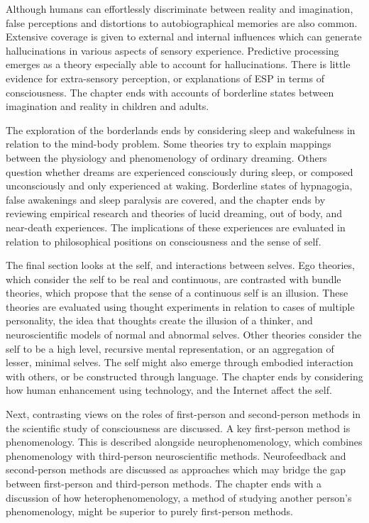 \documentclass[a4paper]{article}
\begin{document}
Although humans can effortlessly discriminate between reality and imagination,
false perceptions and distortions to autobiographical memories are also
common. Extensive coverage is given to external and internal influences which
can generate hallucinations in various aspects of sensory experience.
Predictive processing emerges as a theory especially able to account for
hallucinations. There is little evidence for extra-sensory perception, or
explanations of ESP in terms of consciousness. The chapter ends with accounts
of borderline states between imagination and reality in children and adults.

The exploration of the borderlands ends by considering sleep and wakefulness
in relation to the mind-body problem. Some theories try to explain mappings
between the physiology and phenomenology of ordinary dreaming. Others question
whether dreams are experienced consciously during sleep, or composed
unconsciously and only experienced at waking. Borderline states of hypnagogia,
false awakenings and sleep paralysis are covered, and the chapter ends by
reviewing empirical research and theories of lucid dreaming, out of body, and
near-death experiences. The implications of these experiences are evaluated in
relation to philosophical positions on consciousness and the sense of self.

The final section looks at the self, and interactions between selves. Ego
theories, which consider the self to be real and continuous, are contrasted
with bundle theories, which propose that the sense of a continuous self is an
illusion. These theories are evaluated using thought experiments in relation
to cases of multiple personality, the idea that thoughts create the illusion
of a thinker, and neuroscientific models of normal and abnormal selves. Other
theories consider the self to be a high level, recursive mental
representation, or an aggregation of lesser, minimal selves. The self might
also emerge through embodied interaction with others, or be constructed
through language. The chapter ends by considering how human enhancement using
technology, and the Internet affect the self.

Next, contrasting views on the roles of first-person and second-person methods
in the scientific study of consciousness are discussed. A key first-person
method is phenomenology. This is described alongside neurophenomenology, which
combines phenomenology with third-person neuroscientific methods.
Neurofeedback and second-person methods are discussed as approaches which may
bridge the gap between first-person and third-person methods. The chapter ends
with a discussion of how heterophenomenology, a method of studying another
person’s phenomenology, might be superior to purely first-person methods.
\end{document}

